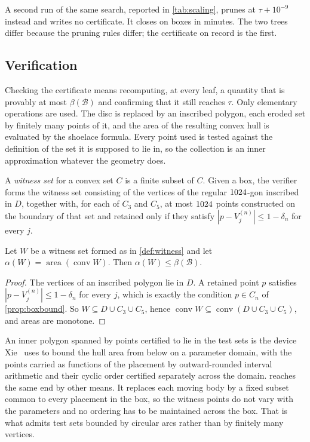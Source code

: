 \documentclass[a4paper,UKenglish,cleveref,autoref,thm-restate,numberwithinsect]{lipics-v2021}
\begin{document}
A second run of the same search, reported in \cref{tab:scaling}, prunes at
$\tau+10^{-9}$ instead and writes no certificate. It closes on \HardBoxes{}
boxes in \HardMinutes{} minutes. The two trees differ because the pruning rules
differ; the certificate on record is the first.

\subsection{Verification}
\label{sec:verify}

Checking the certificate means recomputing, at every leaf, a quantity that is
provably at most $\beta(\mathcal{B})$ and confirming that it still reaches $\tau$.
Only elementary operations are used. The disc is replaced by an inscribed
polygon, each eroded set by finitely many points of it, and the area of the
resulting convex hull is evaluated by the shoelace formula. Every point used is
tested against the definition of the set it is supposed to lie in, so the
collection is an inner approximation whatever the geometry does.

\begin{definition}
\label{def:witness}
A \emph{witness set} for a convex set $C$ is a finite subset of $C$. Given a box,
the verifier forms the witness set consisting of the vertices of the regular
$1024$-gon inscribed in $D$, together with, for each of $C_3$ and $C_5$, at
most $1024$ points constructed on the boundary of that set and retained only
if they satisfy $|p-V^{(n)}_j|\le1-\delta_n$ for every $j$.
\end{definition}

\begin{lemma}
\label{lem:verifierbound}
Let $W$ be a witness set formed as in \cref{def:witness} and let
$\alpha(W)=\operatorname{area}(\operatorname{conv}W)$. Then
$\alpha(W)\le\beta(\mathcal{B})$.
\end{lemma}

\begin{proof}
The vertices of an inscribed polygon lie in $D$. A retained point $p$ satisfies
$|p-V^{(n)}_j|\le1-\delta_n$ for every $j$, which is exactly the condition
$p\in C_n$ of \cref{prop:boxbound}. So $W\subseteq D\cup C_3\cup C_5$, hence
$\operatorname{conv}W\subseteq\operatorname{conv}(D\cup C_3\cup C_5)$, and areas
are monotone.
\end{proof}

An inner polygon spanned by points certified to lie in the test sets is the
device Xie~\cite{Xie2026} uses to bound the hull area from below on a parameter
domain, with the points carried as functions of the placement by outward-rounded
interval arithmetic and their cyclic order certified separately across the domain.
 reaches the same end by other means. It replaces each moving
body by a fixed subset common to every placement in the box, so the witness points
do not vary with the parameters and no ordering has to be maintained across the
box. That is what admits test sets bounded by circular arcs rather than by
finitely many vertices.
\end{document}
